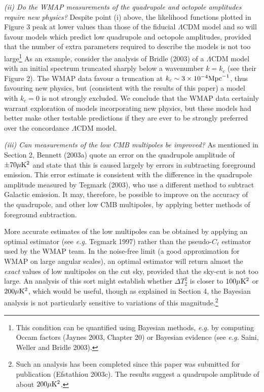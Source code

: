 \smallskip

\noindent
{\it (ii) Do the WMAP measurements of the quadrupole and octopole
amplitudes require new physics?} Despite point (i) above, the
likelihood functions plotted in Figure 3 peak at lower values than
those of the fiducial $\Lambda$CDM model and so will favour models
which predict low quadrupole and octopole amplitudes, provided that
the number of extra parameters required to describe the models is not
too large\footnote{ This condition can be quantified using Bayesian
methods, {\it e.g.} by computing Occam factors (Jaynes 2003, Chapter
20) or Bayesian evidence (see {\it e.g.} Saini, Weller and Bridle
2003).} As an example, consider the analysis of Bridle \etals (2003)
of a $\Lambda$CDM model with an initial spectrum truncated sharply
below a wavenumber $k=k_c$ (see their Figure 2). The WMAP data favour
a truncation at $k_c \sim 3 \times 10^{-4} {\rm Mpc}^{-1}$, thus
favouring new physics, but (consistent with the results of this paper)
a model with $k_c =0$ is not strongly excluded. We conclude that the
WMAP data certainly warrant exploration of models incorporating new
physics, but these models had better make other testable predictions
if they are ever to be strongly preferred  over the concordance
$\Lambda$CDM model.

\smallskip

\noindent
{\it (iii) Can measurements of the low CMB multipoles be improved?} As mentioned
in Section 2, Bennett \etals (2003a) quote an error on the quadrupole amplitude
of $\pm 70 \mk2$ and state that this is  caused largely by errors in subtracting
foreground emission. This error estimate is consistent with the difference in the
quadrupole amplitude measured by Tegmark \etals (2003), who use a different method
to subtract Galactic emission. It may, therefore, be possible to improve on the
accuracy of the quadrupole, and other low CMB multipoles, by applying better methods
of foreground subtraction. 

More accurate estimates of the low multipoles can be obtained by
applying an optimal estimator (see {\it e.g.} Tegmark 1997) rather than the
pseudo-$C_\ell$ estimator used by the WMAP team.  In the
noise-free limit (a good approximation for WMAP on large angular
scales), an optimal estimator will return almost the {\it exact}
values of low multipoles on the cut sky, provided that the sky-cut is
not too large. An
analysis of this sort might establish whether $\Delta T_2^2$ is closer
to $100 \mk2$ or $200 \mk2$, which would be useful, though as
explained in Section 4, the Bayesian analysis is not particularly
sensitive to variations of this magnitude.\footnote{Such an analysis
has been completed since this paper was submitted for publication
(Efstathiou 2003c). The results suggest a quadrupole amplitude of
about $200 \mk2$.}







